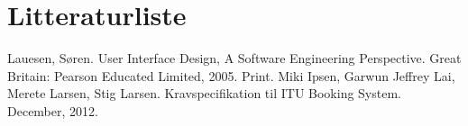 \chapter{Litteraturliste}
\label{BIB}
\begin{thebibliography}{9}
 Lauesen, Søren. User Interface Design, A Software Engineering Perspective. Great Britain: Pearson Educated Limited, 2005.  Print.
 Miki Ipsen, Garwun Jeffrey Lai, Merete Larsen, Stig Larsen. Kravspecifikation til ITU Booking System. December, 2012.
\end{thebibliography}
\label{A_BIB}